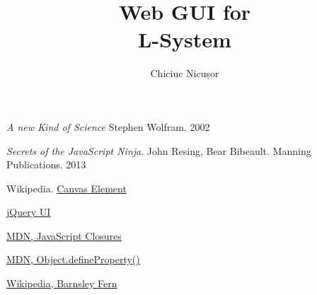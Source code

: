 \documentclass{article}
\begin{document}
    \title{Web GUI for \\ L-System}
    \author{Chiciuc Nicușor}
    \maketitle

    
    \tableofcontents

    

    
    
    

    

    


    
    

    

    \begin{thebibliography}{9}

            \emph{A new Kind of Science}
            Stephen Wolfram. 2002

            \emph{Secrets of the JavaScript Ninja}.
            John Resing, Bear Bibeault. Manning Publications.  2013

            Wikipedia. 
            \href{http://en.wikipedia.org/wiki/Canvas_element}{Canvas Element}

            \href{http://jqueryui.com/}{jQuery UI}

            \href{https://developer.mozilla.org/en-US/docs/Web/JavaScript/Guide/Closures}{MDN, JavaScript Closures}

            \href{https://developer.mozilla.org/en-US/docs/Web/JavaScript/Reference/Global_Objects/Object/defineProperty}{MDN, Object.defineProperty()}

            \href{http://en.wikipedia.org/wiki/Barnsley_fern}{Wikipedia, Barnsley Fern}

    \end{thebibliography}
\end{document}
